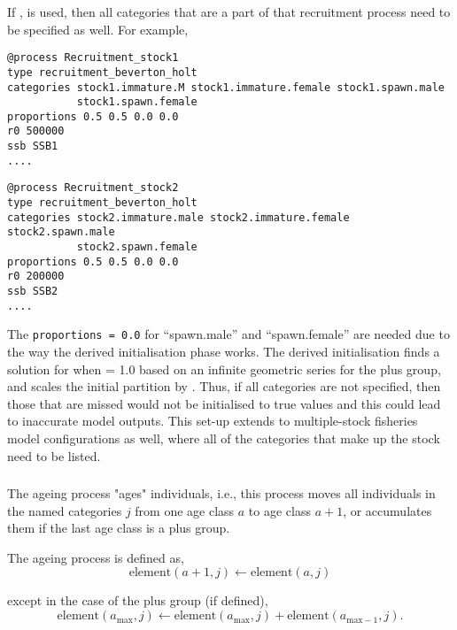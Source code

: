 If ,  is used, then all categories that are a part of that recruitment process need to be specified as well. For example,

{\small{\begin{verbatim}
@process Recruitment_stock1
type recruitment_beverton_holt
categories stock1.immature.M stock1.immature.female stock1.spawn.male
           stock1.spawn.female
proportions 0.5 0.5 0.0 0.0
r0 500000
ssb SSB1
....
\end{verbatim}}}

{\small{\begin{verbatim}
@process Recruitment_stock2
type recruitment_beverton_holt
categories stock2.immature.male stock2.immature.female stock2.spawn.male 
           stock2.spawn.female
proportions 0.5 0.5 0.0 0.0
r0 200000
ssb SSB2
....
\end{verbatim}}}

The \texttt{proportions = 0.0} for \enquote{spawn.male} and \enquote{spawn.female} are needed due to the way the derived initialisation phase works. The derived initialisation finds a solution for when  = 1.0 based on an infinite geometric series for the plus group, and scales the initial partition by . Thus, if all categories are not specified, then those that are missed would not be initialised to true values and this could lead to inaccurate model outputs. This set-up extends to multiple-stock fisheries model configurations as well, where all of the categories that make up the stock need to be listed.

\subsubsection{\label{sec:Process-Ageing}}

The ageing process "ages" individuals, i.e., this process moves all individuals in the named categories $j$ from one age class $a$ to age class $a + 1$, or accumulates them if the last age class is a plus group.

The ageing process is defined as,
\begin{equation}
  \text{element}(a + 1,j) \leftarrow \text{element}(a,j)
\end{equation}

except in the case of the plus group (if defined),
\begin{equation}
  \text{element}(a_{\text{max}}, j) \leftarrow \text{element}(a_{\text{max}}, j) + \text{element}(a_{\text{max}-1}, j).
\end{equation}

